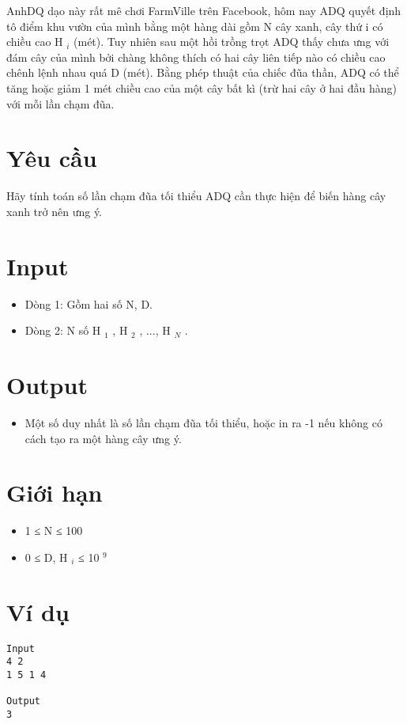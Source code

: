 



   AnhDQ dạo này rất mê chơi FarmVille trên Facebook, hôm nay ADQ quyết định tô điểm khu vườn của mình bằng một hàng dài gồm N cây xanh, cây thứ i có chiều cao H   $_    i   $   (mét). Tuy nhiên sau một hồi trồng trọt ADQ thấy chưa ưng với đám cây của mình bởi chàng không thích có hai cây liên tiếp nào có chiều cao chênh lệnh nhau quá D (mét). Bằng phép thuật của chiếc đũa thần, ADQ có thể tăng hoặc giảm 1 mét chiều cao của một cây bất kì (trừ hai cây ở hai đầu hàng) với mỗi lần chạm đũa.  

\section{   Yêu cầu  }

   Hãy tính toán số lần chạm đũa tối thiểu ADQ cần thực hiện để biến hàng cây xanh trở nên ưng ý.  

\section{   Input  }
\begin{itemize}
	\item     Dòng 1: Gồm hai số N, D.   
	\item     Dòng 2: N số H    $_     1    $    , H    $_     2    $    , ..., H    $_     N    $    .   
\end{itemize}

\section{   Output  }
\begin{itemize}
	\item     Một số duy nhất là số lần chạm đũa tối thiểu, hoặc in ra -1 nếu không có cách tạo ra một hàng cây ưng ý.   
\end{itemize}

\section{   Giới hạn  }
\begin{itemize}
	\item     1 ≤ N ≤ 100   
	\item     0 ≤ D, H    $_     i    $    ≤ 10    $^     9    $
\end{itemize}

\section{   Ví dụ  }
\begin{verbatim}
Input
4 2
1 5 1 4

Output
3
\end{verbatim}
